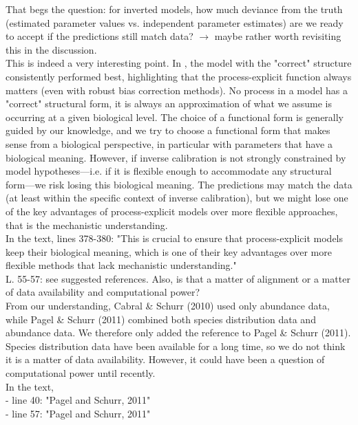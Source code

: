 \documentclass[a4paper, 11pt]{article}
\begin{document}
\noindent That begs the question: for inverted models, how much deviance from the truth (estimated parameter values vs. independent parameter estimates) are we ready to accept if the predictions still match data? $\rightarrow$ maybe rather worth revisiting this in the discussion.\\
\textcolor{customblue}{
This is indeed a very interesting point. In \citet{Oberpriller2021}, the model with the "correct" structure consistently performed best, highlighting that the process-explicit function always matters (even with robust bias correction methods). No process in a model has a "correct" structural form, it is always an approximation of what we assume is occurring at a given biological level. The choice of a functional form is generally guided by our knowledge, and we try to choose a functional form that makes sense from a biological perspective, in particular with parameters that have a biological meaning. However, if inverse calibration is not strongly constrained by model hypotheses---i.e. if it is flexible enough to accommodate any structural form---we risk losing this biological meaning. The predictions may match the data (at least within the specific context of inverse calibration), but we might lose one of the key advantages of process-explicit models over more flexible approaches, that is the mechanistic understanding.}\\
In the text, lines 378-380: \textcolor{customred}{"This is crucial to ensure that process-explicit models keep their biological meaning, which is one of their key advantages over more flexible methods that lack mechanistic understanding."}\\

\noindent L. 55-57: see suggested references. Also, is that a matter of alignment or a matter of data availability and computational power?\\
\textcolor{customblue}{From our understanding, Cabral \& Schurr (2010) used only abundance data, while Pagel \& Schurr (2011) combined both species distribution data and abundance data. We therefore only added the reference to Pagel \& Schurr (2011).\\
Species distribution data have been available for a long time, so we do not think it is a matter of data availability. However, it could have been a question of computational power until recently.}\\
In the text,\\
- line 40: \textcolor{customred}{"Pagel and Schurr, 2011"}\\
- line 57: \textcolor{customred}{"Pagel and Schurr, 2011"}\\
\end{document}
